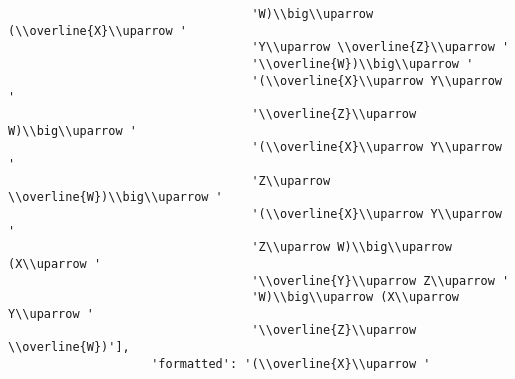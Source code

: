 \begin{verbatim}
                                  'W)\\big\\uparrow (\\overline{X}\\uparrow '
                                  'Y\\uparrow \\overline{Z}\\uparrow '
                                  '\\overline{W})\\big\\uparrow '
                                  '(\\overline{X}\\uparrow Y\\uparrow '
                                  '\\overline{Z}\\uparrow W)\\big\\uparrow '
                                  '(\\overline{X}\\uparrow Y\\uparrow '
                                  'Z\\uparrow \\overline{W})\\big\\uparrow '
                                  '(\\overline{X}\\uparrow Y\\uparrow '
                                  'Z\\uparrow W)\\big\\uparrow (X\\uparrow '
                                  '\\overline{Y}\\uparrow Z\\uparrow '
                                  'W)\\big\\uparrow (X\\uparrow Y\\uparrow '
                                  '\\overline{Z}\\uparrow \\overline{W})'],
                    'formatted': '(\\overline{X}\\uparrow '

\end{verbatim}
